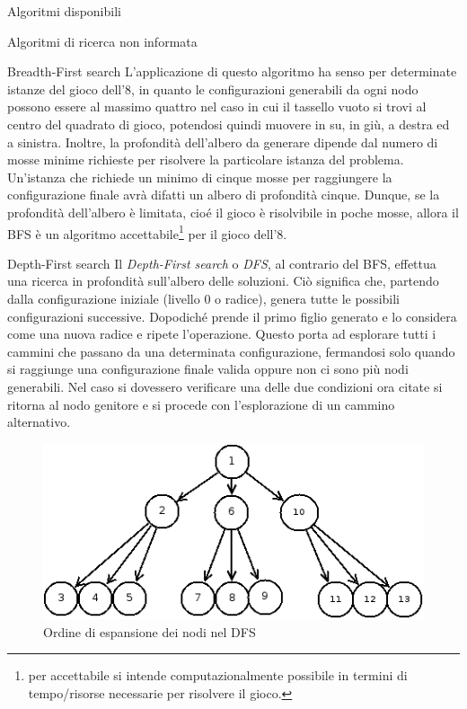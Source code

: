 \begin{chapter}{Algoritmi disponibili}
\begin{section}{Algoritmi di ricerca non informata}
\begin{subsection}{Breadth-First search}
    L'applicazione di questo algoritmo ha senso per determinate istanze del gioco dell'8,
    in quanto le configurazioni generabili da ogni nodo possono essere al massimo quattro
    nel caso in cui il tassello vuoto si trovi al centro del quadrato di gioco, potendosi
    quindi muovere in su, in gi\`u, a destra ed a sinistra. Inoltre, la profondit\`a
    dell'albero da generare dipende dal numero di mosse minime richieste per risolvere la
    particolare istanza del problema. Un'istanza che richiede un minimo di cinque mosse per
    raggiungere la configurazione finale avr\`a difatti un albero di profondit\`a cinque. 
    Dunque, se la profondit\`a dell'albero \`e limitata, cio\'e il gioco \`e risolvibile
    in poche mosse, allora il BFS \`e un algoritmo accettabile\footnote{per accettabile si
    intende computazionalmente possibile in termini di tempo/risorse necessarie per risolvere
    il gioco.} per il gioco dell'8.
	\end{subsection}

	\begin{subsection}{Depth-First search}
    Il \textit{Depth-First search} o \textit{DFS}, al contrario del BFS, effettua una
    ricerca in profondit\`a sull'albero delle soluzioni. Ci\`o significa che, partendo
    dalla configurazione iniziale (livello 0 o radice), genera tutte le possibili
    configurazioni successive. Dopodich\'e prende il primo figlio generato e lo
    considera come una nuova radice e ripete l'operazione. Questo porta ad esplorare
    tutti i cammini che passano da una determinata configurazione, fermandosi solo quando
    si raggiunge una configurazione finale valida oppure non ci sono pi\`u nodi generabili.
    Nel caso si dovessero verificare una delle due condizioni ora citate si ritorna al
    nodo genitore e si procede con l'esplorazione di un cammino alternativo.

    \begin{figure}[!htb]
        \centering
        \includegraphics[scale=0.5]{img/dfs.png}
        \caption{Ordine di espansione dei nodi nel DFS}
        \label{fig:dfs-tree}
    \end{figure}
	\end{subsection}


\end{section}
\end{chapter}
